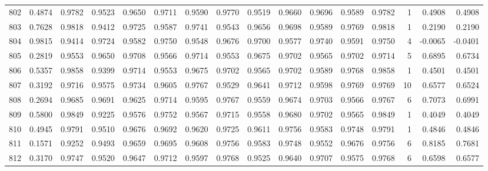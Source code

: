 \begin{tabular}{lrrrrrrrrrrrrrrr}
802 &      0.4874 &  0.9782 &  0.9523 &  0.9650 &  0.9711 &  0.9590 &  0.9770 &  0.9519 &  0.9660 &  0.9696 &   0.9589 &     0.9782 &      1 &                    0.4908 &                     0.4908 \\
803 &      0.7628 &  0.9818 &  0.9412 &  0.9725 &  0.9587 &  0.9741 &  0.9543 &  0.9656 &  0.9698 &  0.9589 &   0.9769 &     0.9818 &      1 &                    0.2190 &                     0.2190 \\
804 &      0.9815 &  0.9414 &  0.9724 &  0.9582 &  0.9750 &  0.9548 &  0.9676 &  0.9700 &  0.9577 &  0.9740 &   0.9591 &     0.9750 &      4 &                   -0.0065 &                    -0.0401 \\
805 &      0.2819 &  0.9553 &  0.9650 &  0.9708 &  0.9566 &  0.9714 &  0.9553 &  0.9675 &  0.9702 &  0.9565 &   0.9702 &     0.9714 &      5 &                    0.6895 &                     0.6734 \\
806 &      0.5357 &  0.9858 &  0.9399 &  0.9714 &  0.9553 &  0.9675 &  0.9702 &  0.9565 &  0.9702 &  0.9589 &   0.9768 &     0.9858 &      1 &                    0.4501 &                     0.4501 \\
807 &      0.3192 &  0.9716 &  0.9575 &  0.9734 &  0.9605 &  0.9767 &  0.9529 &  0.9641 &  0.9712 &  0.9598 &   0.9769 &     0.9769 &     10 &                    0.6577 &                     0.6524 \\
808 &      0.2694 &  0.9685 &  0.9691 &  0.9625 &  0.9714 &  0.9595 &  0.9767 &  0.9559 &  0.9674 &  0.9703 &   0.9566 &     0.9767 &      6 &                    0.7073 &                     0.6991 \\
809 &      0.5800 &  0.9849 &  0.9225 &  0.9576 &  0.9752 &  0.9567 &  0.9715 &  0.9558 &  0.9680 &  0.9702 &   0.9565 &     0.9849 &      1 &                    0.4049 &                     0.4049 \\
810 &      0.4945 &  0.9791 &  0.9510 &  0.9676 &  0.9692 &  0.9620 &  0.9725 &  0.9611 &  0.9756 &  0.9583 &   0.9748 &     0.9791 &      1 &                    0.4846 &                     0.4846 \\
811 &      0.1571 &  0.9252 &  0.9493 &  0.9659 &  0.9695 &  0.9608 &  0.9756 &  0.9583 &  0.9748 &  0.9552 &   0.9676 &     0.9756 &      6 &                    0.8185 &                     0.7681 \\
812 &      0.3170 &  0.9747 &  0.9520 &  0.9647 &  0.9712 &  0.9597 &  0.9768 &  0.9525 &  0.9640 &  0.9707 &   0.9575 &     0.9768 &      6 &                    0.6598 &                     0.6577 \\

\end{tabular}
